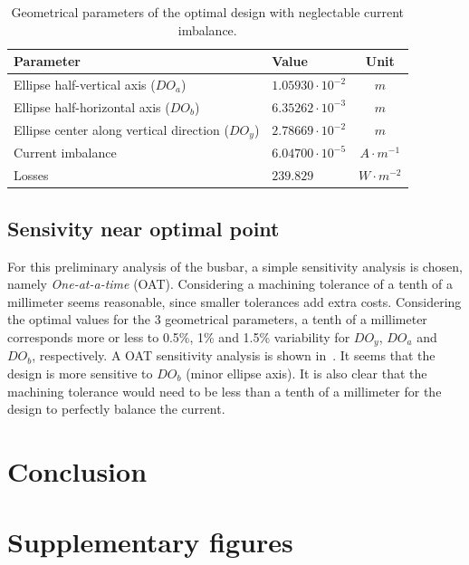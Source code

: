 \documentclass[10pt,a4paper]{article}
\begin{document}
\begin{table}[h]
    \centering
    \begin{tabular}{|l|l|c|}
        \hline
        Parameter & Value & Unit \\\hline
        Ellipse half-vertical axis              ($DO_a$) & $1.05930 \cdot 10^{-2}$ & $m$              \\\hline
        Ellipse half-horizontal axis            ($DO_b$) & $6.35262 \cdot 10^{-3}$ & $m$              \\\hline
        Ellipse center along vertical direction ($DO_y$) & $2.78669 \cdot 10^{-2}$ & $m$              \\\hline
        Current imbalance                                & $6.04700 \cdot 10^{-5}$ & $A \cdot m^{-1}$ \\\hline
        Losses                                           & $239.829$               & $W \cdot m^{-2}$ \\\hline
    \end{tabular}
    \caption{Geometrical parameters of the optimal design with neglectable current imbalance.}
    \label{table:optimal-point}
\end{table}

\subsection{Sensivity near optimal point}
\label{subsection:sensitivity}

For this preliminary analysis of the busbar, a simple sensitivity analysis is chosen, namely \emph{One-at-a-time} (OAT).
Considering a machining tolerance of a tenth of a millimeter seems reasonable, since smaller tolerances
add extra costs. Considering the optimal values for the 3 geometrical parameters, a tenth of a millimeter corresponds
more or less to 0.5\%, 1\% and 1.5\% variability for $DO_y$, $DO_a$ and $DO_b$, respectively.
A OAT sensitivity analysis is shown in~.
It seems that the design is more sensitive to $DO_b$ (minor ellipse axis).
It is also clear that the machining tolerance would need to be less than a tenth of a millimeter for the design
to perfectly balance the current.

\section{Conclusion}

\pagebreak

\section{Supplementary figures}
\end{document}
